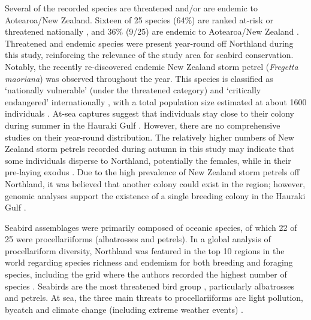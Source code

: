 \documentclass[preprint, 3p, authoryear]{elsarticle} %
\begin{document}
Several of the recorded species are threatened and/or are endemic to Aotearoa/New Zealand. Sixteen of 25 species (64\%) are ranked at-risk or threatened nationally \citep{robertson2021}, and 36\% (9/25) are endemic to Aotearoa/New Zealand \citep{williams2006}. Threatened and endemic species were present year-round off Northland during this study, reinforcing the relevance of the study area for seabird conservation. Notably, the recently re-discovered endemic New Zealand storm petrel (\emph{Fregetta maoriana}) was observed throughout the year. This species is classified as `nationally vulnerable' (under the threatened category) and `critically endangered' internationally \citep{robertson2021}, with a total population size estimated at about 1600 individuals \citep{rayner2020}. At-sea captures suggest that individuals stay close to their colony during summer in the Hauraki Gulf \citep{rayner2013, rayner2020}. However, there are no comprehensive studies on their year-round distribution. The relatively higher numbers of New Zealand storm petrels recorded during autumn in this study may indicate that some individuals disperse to Northland, potentially the females, while in their pre-laying exodus \citep{rayner2013}. Due to the high prevalence of New Zealand storm petrels off Northland, it was believed that another colony could exist in the region; however, genomic analyses support the existence of a single breeding colony in the Hauraki Gulf \citep{correll2024}.

Seabird assemblages were primarily composed of oceanic species, of which 22 of 25 were procellariiforms (albatrosses and petrels). In a global analysis of procellariform diversity, Northland was featured in the top 10 regions in the world regarding species richness and endemism for both breeding and foraging species, including the grid where the authors recorded the highest number of species \citep{chown1998}. Seabirds are the most threatened bird group \citep{dias2019}, particularly albatrosses and petrels. At sea, the three main threats to procellariiforms are light pollution, bycatch and climate change (including extreme weather events) \citep{phillips2016, rodriguez2019}.
\end{document}

